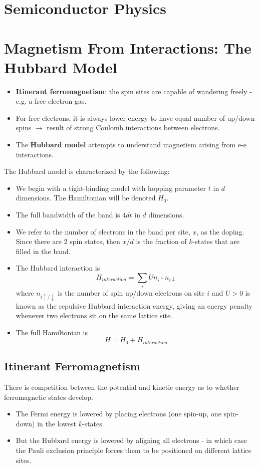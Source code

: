 \documentclass[10pt]{article}
\begin{document}
\section{Semiconductor Physics }

\section{Magnetism From Interactions: The Hubbard Model}
\begin{itemize}
  \item \textbf{Itinerant ferromagnetism}: the spin sites are capable of wandering freely - e.g. a free electron gas.
  \item For free electrons, it is always lower energy to have equal number of up/down spins $\rightarrow$ result of strong Coulomb interactions
  between electrons.
  \item The \textbf{Hubbard model} attempts to understand magnetism arising from e-e interactions.
\end{itemize}
The Hubbard model is characterized by the following:
\begin{itemize}
  \item We begin with a tight-binding model with hopping parameter $t$ in $d$ dimensions. The Hamiltonian will
  be denoted $H_{0}$.
  \item The full bandwidth of the band is $4dt$ in $d$ dimensions.
  \item We refer to the number of electrons in the band per site, $x$, as the doping. Since there are $2$ spin states,
  then $x/d$ is the fraction of $k$-states that are filled in the band.
  \item The Hubbard interaction is
  $$
  H_{interaction} = \sum_{i}U n_{i\uparrow}n_{i\downarrow}
  $$
  where $n_{i\uparrow/\downarrow}$ is the number of spin up/down electrons on site $i$ and $U > 0$ is known as the repulsive Hubbard
  interaction energy, giving an energy penalty whenever two electrons sit on the same lattice site.
  \item The full Hamiltonian is
  $$H = H_{0} + H_{interaction}$$
\end{itemize}

\subsection{Itinerant Ferromagnetism}
There is competition between the potential and kinetic energy as to whether ferromagnetic states develop.
\begin{itemize}
  \item The Fermi energy is lowered by placing electrons (one spin-up, one spin-down) in the lowest $k$-states.
  \item But the Hubbard energy is lowered by aligning all electrons - in which case the Pauli exclusion principle forces them
  to be positioned on different lattice sites.
\end{itemize}
\end{document}
